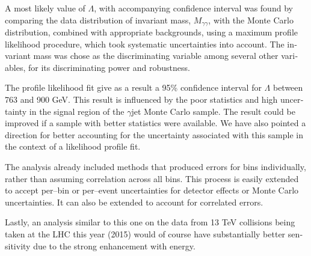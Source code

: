 \begin{english}
A most likely value of $\Lambda$, with accompanying confidence interval was found by comparing the data distribution of invariant mass, $M_{\gamma\gamma}$, with the Monte Carlo distribution, combined with appropriate backgrounds, using a maximum profile likelihood procedure, which took systematic uncertainties into account. The invariant mass was chose as the discriminating variable among several other variables, for its discriminating power and robustness.

The profile likelihood fit give as a result a 95\% confidence interval for $\Lambda$ between 763 and 900 GeV. This result is influenced by the poor statistics and high uncertainty in the signal region of the \atlas{} $\gamma$jet Monte Carlo sample. The result could be improved if a sample with better statistics were available. We have also pointed a direction for better accounting for the uncertainty associated with this sample in the context of a likelihood profile fit.

The analysis already included methods that produced errors for bins individually, rather than assuming correlation across all bins. This process is easily extended to accept per--bin or per--event uncertainties for detector effects or Monte Carlo uncertainties. It can also be extended to account for correlated errors.

Lastly, an analysis similar to this one on the data from 13 TeV collisions being taken at the LHC this year (2015) would of course have substantially better sensitivity due to the strong enhancement with energy.

\printbibliography[title=References]



\end{english}

